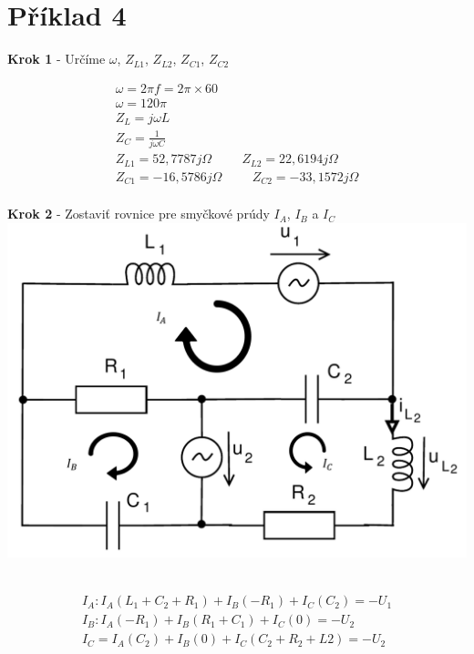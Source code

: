 \section{Příklad 4}

\begin{center}
    \textbf{Krok 1} - Určíme $\omega$, $Z_{L1}$, $Z_{L2}$, $Z_{C1}$, $Z_{C2}$
\end{center}

\begin{gather*}
\omega = 2 \pi f = 2 \pi \times 60 \\
\omega = 120 \pi \\
Z_L = j \omega L \\
Z_C = \frac {1} {j \omega C} \\
Z_{L1} = 52,7787j \Omega \hspace{1cm}
Z_{L2} = 22,6194j \Omega \\
 	Z_{C1} = -16,5786j \Omega \hspace{1cm}
Z_{C2} = -33,1572j \Omega \\
\end{gather*}

\begin{center}
    	\textbf{Krok 2} - Zostaviť rovnice pre smyčkové prúdy $I_A$, $I_B$ a $I_C$
	\includegraphics[scale=0.3,keepaspectratio]{fig/pr_4_1.png} \
\end{center}

\begin{gather*}
I_A: I_A(L_1+C_2+R_1) + I_B(-R_1)+I_C(C_2) = -U_1 \\
I_B: I_A(-R_1) + I_B(R_1+C_1) + I_C(0) = -U_2 \\
I_C = I_A(C_2) + I_B(0) + I_C(C_2 + R_2 + L2) = -U_2 \\
\end{gather*}

